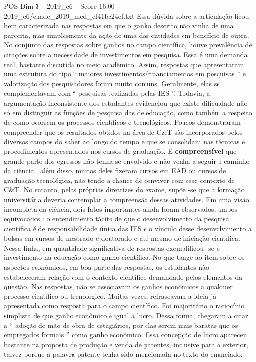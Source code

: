\begin{textsample}{POS Dim 3 – 2019\_c6 – Score 16.00 – 2019\_c6/enade\_2019\_med\_cf41be24ef.txt}
Essa dúvida sobre a articulação ficou bem caracterizada nas respostas em que o ganho descrito não vinha de uma parceria, mas simplesmente da ação de uma das entidades em benefício de outra.
No conjunto das respostas sobre ganhos no campo científico, houve prevalência de citações sobre a necessidade de investimentos em pesquisa.
Essa é uma demanda real, bastante discutida no meio acadêmico.
Assim, respostas que apresentaram uma estrutura do tipo “ maiores investimentos/financiamentos em pesquisas ” e valorização dos pesquisadores foram muito comuns.
Geralmente, elas se complementavam com “ pesquisas realizadas pelas IES ”.
Todavia, a argumentação inconsistente dos estudantes evidenciou que existe dificuldade não só em distinguir as funções de pesquisa das de educação, como também a respeito de como ocorrem os processos científicos e tecnológicos.
Poucos demonstraram compreender que os resultados obtidos na área de C\&T são incorporados pelos diversos campos do saber ao longo do tempo e que se consolidam nas técnicas e procedimentos apresentados nos cursos de graduação.
É \textbf{compreensível} que grande parte dos egressos não tenha se envolvido e não venha a seguir o caminho da ciência ; além disso, muitos deles fizeram cursos em EAD ou cursos de graduação tecnológica, não tendo a chance de conviver com esse contexto de C\&T.
No entanto, pelas próprias diretrizes do exame, supõe -se que a formação universitária deveria contemplar a compreensão dessas atividades.
Em uma visão incompleta da ciência, dois fatos importantes ainda foram observados, ambos equivocados : o entendimento tácito de que o desenvolvimento da pesquisa científica é de responsabilidade única das IES e o vínculo desse desenvolvimento a bolsas em cursos de mestrado e doutorado e até mesmo de iniciação científica.
Nessa linha, em quantidade significativa de respostas exemplificou -se o investimento na educação como ganho científico.
No que tange ao item sobre os aspectos econômicos, em boa parte das respostas, os estudantes não estabeleceram relação com o contexto científico demandado pelos elementos da questão.
Nas respostas, não se associavam os ganhos econômicos a qualquer processo científico ou tecnológico.
Muitas vezes, refraseavam a ideia já apresentada como resposta para o campo científico.
Foi majoritário o raciocínio simplista de que ganho econômico é igual a lucro.
Dessa forma, chegaram a citar a “ adoção de mão de obra de estagiários, por elas serem mais baratas que os empregados formais ” como ganho econômico.
Essa concepção de lucro apareceu bastante na proposta de produção e venda de patentes, inclusive para o exterior, talvez porque a palavra patente tenha sido mencionada no texto do enunciado.

\end{textsample}
